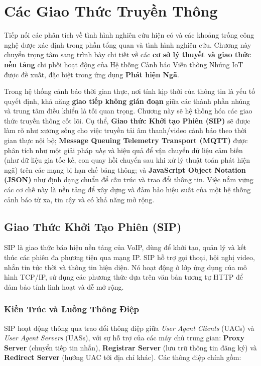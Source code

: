 \section{Các Giao Thức Truyền Thông}
\label{sec:communication_protocols}
Tiếp nối các phân tích về tình hình nghiên cứu hiện có và các khoảng trống công nghệ được xác định trong phần tổng quan và tình hình nghiên cứu. Chương này chuyển trọng tâm sang trình bày chi tiết về các \textbf{cơ sở lý thuyết và giao thức nền tảng} chi phối hoạt động của Hệ thống Cảnh báo Viễn thông Nhúng IoT được đề xuất, đặc biệt trong ứng dụng \textbf{Phát hiện Ngã}.

Trong hệ thống cảnh báo thời gian thực, nơi tính kịp thời của thông tin là yếu tố quyết định, khả năng \textbf{giao tiếp không gián đoạn} giữa các thành phần nhúng và trung tâm điều khiển là tối quan trọng. Chương này sẽ hệ thống hóa các giao thức truyền thông cốt lõi. Cụ thể, \textbf{Giao thức Khởi tạo Phiên (SIP)} sẽ được làm rõ như xương sống cho việc truyền tải âm thanh/video cảnh báo theo thời gian thực nội bộ; \textbf{Message Queuing Telemetry Transport (MQTT)} được phân tích như một giải pháp \textit{nhẹ} và hiệu quả để vận chuyển dữ liệu cảm biến (như dữ liệu gia tốc kế, con quay hồi chuyển sau khi xử lý thuật toán phát hiện ngã) trên các mạng bị hạn chế băng thông; và \textbf{JavaScript Object Notation (JSON)} như định dạng chuẩn để cấu trúc và trao đổi thông tin. Việc nắm vững các cơ chế này là nền tảng để xây dựng và đảm bảo hiệu suất của một hệ thống cảnh báo từ xa, tin cậy và có khả năng mở rộng.
\subsection{Giao Thức Khởi Tạo Phiên (SIP)}
\label{subsec:sip_protocol}

SIP là giao thức báo hiệu nền tảng của VoIP, dùng để khởi tạo, quản lý và kết thúc các phiên đa phương tiện qua mạng IP. SIP hỗ trợ gọi thoại, hội nghị video, nhắn tin tức thời và thông tin hiện diện. Nó hoạt động ở lớp ứng dụng của mô hình TCP/IP, sử dụng các phương thức dựa trên văn bản tương tự HTTP để đảm bảo tính linh hoạt và dễ mở rộng.

\subsubsection{Kiến Trúc và Luồng Thông Điệp}
\label{subsubsec:sip_architecture}

SIP hoạt động thông qua trao đổi thông điệp giữa \textit{User Agent Clients} (UACs) và \textit{User Agent Servers} (UASs), với sự hỗ trợ của các máy chủ trung gian: \textbf{Proxy Server} (chuyển tiếp tin nhắn), \textbf{Registrar Server} (lưu trữ thông tin đăng ký) và \textbf{Redirect Server} (hướng UAC tới địa chỉ khác). Các thông điệp chính gồm:


